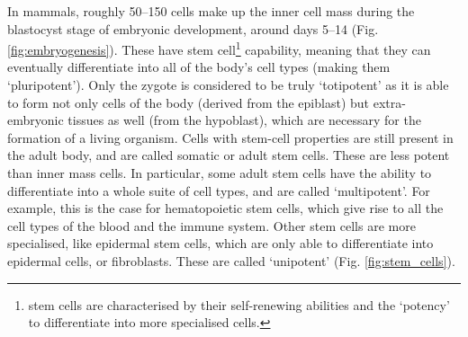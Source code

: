 In mammals, roughly 50–150 cells make up the inner cell mass during the blastocyst stage of embryonic development, around days 5–14 (Fig. \ref{fig:embryogenesis}). 
These have stem cell\footnote{stem cells are characterised by their self-renewing abilities and the `potency' to differentiate into more specialised cells.} capability, meaning that they can eventually differentiate into all of the body's cell types (making them `pluripotent').
Only the zygote is considered to be truly `totipotent' as it is able to form not only cells of the body (derived from the epiblast) but extra-embryonic tissues as well (from the hypoblast), which are necessary for the formation of a living organism.
Cells with stem-cell properties are still present in the adult body, and are called somatic or adult stem cells.
These are less 
potent
than inner mass cells.
In particular, some adult stem cells have the ability to differentiate into a whole suite of cell types, and are called `multipotent'.
For example, this is the case for hematopoietic stem cells, which give rise to all the cell types of the blood and the immune system.
Other stem cells are more specialised, like epidermal stem cells, which are only able to differentiate into epidermal cells, or fibroblasts.
These are called `unipotent' (Fig. \ref{fig:stem_cells}).\\

